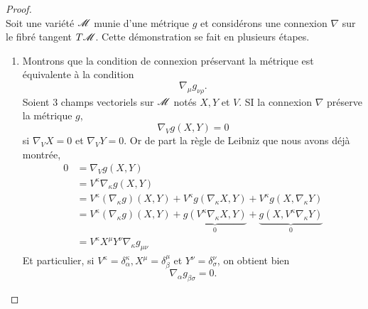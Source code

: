 \documentclass[a4paper,11pt]{report}
\begin{document}
                \begin{proof}${}$\\
                    Soit une variété $\mathscr{M}$ munie d'une métrique $g$ et considérons une connexion $\nabla$ sur le fibré tangent $T\mathscr{M}$.
                    Cette démonstration se fait en plusieurs étapes.
                    \begin{enumerate}[label = \textit{\roman*)}]
                            \item Montrons que la condition de connexion préservant la            métrique est équivalente à la condition
                                \begin{equation}
                                    \nabla_\mu g_{\nu\rho}.
                                \end{equation}
                                Soient $3$ champs vectoriels sur $\mathscr{M}$ notés $X,Y$ et $V$. SI la connexion $\nabla$ préserve la métrique $g$, 
                                \begin{equation}
                                    \nabla_Vg(X,Y) = 0
                                \end{equation}
                                si $\nabla_V X = 0$ et $\nabla_V Y = 0$. Or de part la règle de Leibniz que nous avons déjà montrée,
                                \begin{align}
                                    0 &= \nabla_Vg(X,Y) \\
                                    &= V^\kappa \nabla_\kappa g(X,Y)\\
                                    &= V^\kappa(\nabla_\kappa g)(X,Y) + V^\kappa g( \nabla_\kappa X,Y) + V^\kappa g(X, \nabla_\kappa Y)\\
                                    &= V^\kappa(\nabla_\kappa g)(X,Y) + \underbrace{g(V^\kappa \nabla_\kappa X,Y)}_{0} +  \underbrace{g(X, V^\kappa\nabla_\kappa Y)}_{0}\\
                                    &= V^\kappa X^\mu Y^\nu \nabla_\kappa g_{\mu\nu}
                                \end{align}
                                Et particulier, si $V^\kappa = \delta^\kappa_\alpha,X^\mu = \delta^\mu_\beta$ et $Y^\nu = \delta^\nu_\sigma$, on obtient bien
                                \begin{equation}
                                    \nabla_\alpha g_{\beta\sigma} = 0.
                                \end{equation}
                                

\end{enumerate}
\end{proof}
\end{document}
